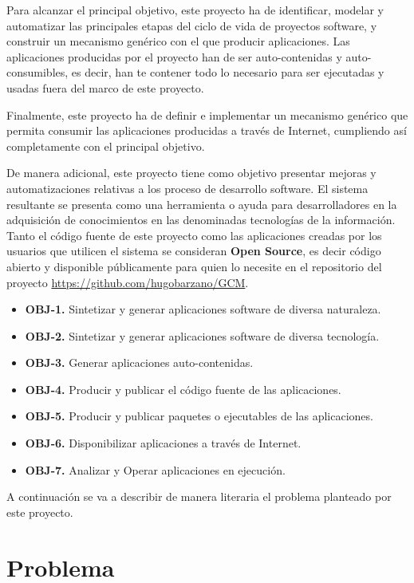 \documentclass[a4paper,11pt]{book}
\begin{document}
Para alcanzar el principal objetivo, este proyecto ha de identificar, modelar y automatizar las principales etapas del ciclo de vida de proyectos software, y construir un mecanismo genérico con el que producir aplicaciones. Las aplicaciones producidas por el proyecto han de ser auto-contenidas y auto-consumibles, es decir, han te contener todo lo necesario para ser ejecutadas y usadas fuera del marco de este proyecto.

Finalmente, este proyecto ha de definir e implementar un mecanismo genérico que permita consumir las aplicaciones producidas a través de Internet, cumpliendo así completamente con el principal objetivo.


De manera adicional, este proyecto tiene como objetivo presentar mejoras y automatizaciones relativas a los proceso de desarrollo software. El sistema resultante se presenta como una herramienta o ayuda para desarrolladores en la adquisición de conocimientos  en las denominadas tecnologías de la información. Tanto el código fuente de este proyecto como las aplicaciones creadas por los usuarios que utilicen el sistema se consideran  \textbf{Open Source}, es decir código abierto y disponible públicamente para quien lo necesite en el repositorio del proyecto \url{https://github.com/hugobarzano/GCM}.

\begin{itemize}
\item \textbf{OBJ-1. } Sintetizar y generar aplicaciones software de diversa naturaleza.
\item \textbf{OBJ-2. } Sintetizar y generar aplicaciones software de diversa tecnología.
\item \textbf{OBJ-3. } Generar aplicaciones auto-contenidas.
\item \textbf{OBJ-4. } Producir y publicar el código fuente de las aplicaciones.
\item \textbf{OBJ-5. } Producir y publicar paquetes o ejecutables de las aplicaciones.
\item \textbf{OBJ-6. } Disponibilizar aplicaciones a través de Internet.
\item \textbf{OBJ-7. } Analizar y Operar  aplicaciones en ejecución. 
\end{itemize}

A continuación se va a describir de manera literaria el problema planteado por este proyecto. 

\section{Problema}
\end{document}
